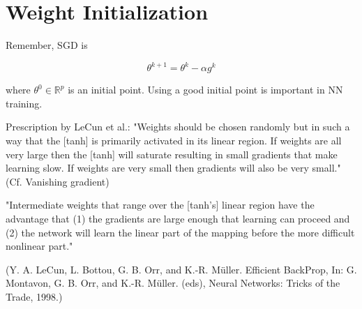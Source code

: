 \section{Weight Initialization}

\begin{concept}
    Remember, SGD is

    $$
    \theta^{k+1}=\theta^{k}-\alpha g^{k}
    $$

    where $\theta^{0} \in \mathbb{R}^{p}$ is an initial point. Using a good initial point is important in NN training.

    Prescription by LeCun et al.: "Weights should be chosen randomly but in such a way that the [tanh] is primarily activated in its linear region. If weights are all very large then the [tanh] will saturate resulting in small gradients that make learning slow. If weights are very small then gradients will also be very small." (Cf. Vanishing gradient)

    "Intermediate weights that range over the [tanh's] linear region have the advantage that (1) the gradients are large enough that learning can proceed and (2) the network will learn the linear part of the mapping before the more difficult nonlinear part."

    (Y. A. LeCun, L. Bottou, G. B. Orr, and K.-R. Müller. Efficient BackProp, In: G. Montavon, G. B. Orr, and K.-R. Müller. (eds), Neural Networks: Tricks of the Trade, 1998.)
\end{concept}

